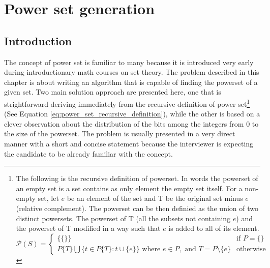%


\chapter{Power set generation}
\label{ch:power_set}
\section*{Introduction}
The concept of power set is familiar to many because it is introduced very early during
introductionary math courses on set theory. The problem described in this chapter is about writing
an algorithm that is capable of finding the powerset of a given set. Two main solution approach are
presented here, one that is strightforward deriving immediately from the recursive definition of
power set\footnote{The following is the recursive definition of powerset. In words the powerset of an empty
set is a set contains as only element the empty set itself. For a non-empty set, let $e$ be an
element of the set and T be the original set minus $e$ (relative complement). The powerset can
be then definied as the union of two distinct powersets. The powerset of T (all the subsets not
containing $e$) and the powerset of T modified in a way such that $e$ is added to all of its
element.
\begin{equation}
	\mathcal{P}(S)=\begin{cases} 
\{\{\}\} & \text{if } P=\{\} \\
P\{T\} \bigcup \{t \in P\{T\} : t \cup \{e\}\} \text{ where } e \in P, \text{ and } T = P \setminus \{e\} & \text{otherwise}
\end{cases}
\label{eq:power_set_recursive_definition}
\end{equation} 
} (See Equation \ref{eq:power_set_recursive_definition}), while the other is based on a clever
observation about the distribution of the bits among the integers from $0$ to the size of the
powerset. The problem is usually presented in a very direct manner with a short and concise
statement because the interviewer is expecting the candidate to be already familiar with the
concept.



